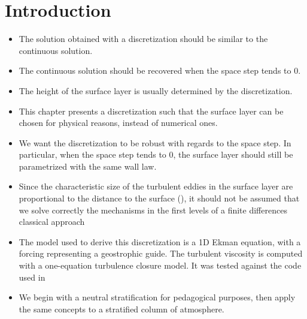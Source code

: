 \section{Introduction}
\begin{itemize}
\item The solution obtained with a discretization
	should be similar to the continuous solution.
\item The continuous solution should be recovered when
	the space step tends to 0.
\item The height of the surface layer
	is usually determined by the discretization.
\item This chapter presents a discretization such that
	the surface layer can be chosen for physical reasons,
		instead of numerical ones.
\item We want the discretization to be robust with regards to
	the space step. In particular, when the space step
		tends to 0, the surface layer should still
		be parametrized with the same wall law.
\item Since the characteristic
	size of the turbulent eddies in the surface layer are
		proportional to the distance to the surface (\cite{kawai2012wall}),
		it should not be assumed that we solve
		correctly the mechanisms in the first levels
		of a finite differences classical approach
\item The model used to derive this discretization is a 1D Ekman
	equation, with a forcing representing a geostrophic guide.
		The turbulent viscosity is computed with a
		one-equation turbulence closure model. It was
		tested against the code used in \cite{lemarie2021gmd}
\item We begin with a neutral stratification for pedagogical purposes,
	then apply the same concepts to a stratified column of
		atmosphere.
\end{itemize}
